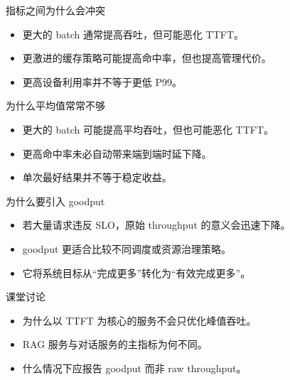 \begin{frame}{指标之间为什么会冲突}
  \begin{itemize}
    \item 更大的 batch 通常提高吞吐，但可能恶化 TTFT。
    \item 更激进的缓存策略可能提高命中率，但也提高管理代价。
    \item 更高设备利用率并不等于更低 P99。
  \end{itemize}
\end{frame}

\begin{frame}{为什么平均值常常不够}
  \begin{itemize}
    \item 更大的 batch 可能提高平均吞吐，但也可能恶化 TTFT。
    \item 更高命中率未必自动带来端到端时延下降。
    \item 单次最好结果并不等于稳定收益。
  \end{itemize}
\end{frame}

\begin{frame}{为什么要引入 goodput}
  \begin{itemize}
    \item 若大量请求违反 SLO，原始 throughput 的意义会迅速下降。
    \item goodput 更适合比较不同调度或资源治理策略。
    \item 它将系统目标从“完成更多”转化为“有效完成更多”。
  \end{itemize}
\end{frame}



\begin{frame}{课堂讨论}
  \begin{itemize}
    \item 为什么以 TTFT 为核心的服务不会只优化峰值吞吐。
    \item RAG 服务与对话服务的主指标为何不同。
    \item 什么情况下应报告 goodput 而非 raw throughput。
  \end{itemize}
\end{frame}

